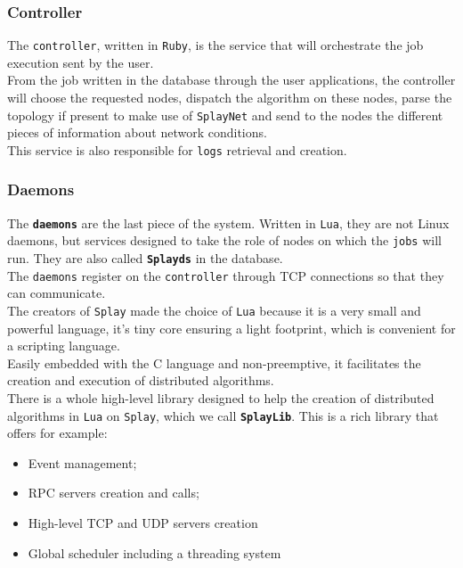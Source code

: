 \documentclass{eplmastersthesis}
\begin{document}
        \subsubsection{Controller}

          The \texttt{controller}, written in \texttt{Ruby}, is the service
          that will orchestrate the job execution sent by the user.\\
          From the job written in the database through the user applications,
          the controller will choose the requested nodes, dispatch the
          algorithm on these nodes, parse the topology if present to make
          use of \texttt{SplayNet} and send to the nodes the different
          pieces of information about network conditions.\\
          This service is also responsible for \texttt{logs}
          retrieval and creation.

        \subsubsection{Daemons}

          The \textbf{\texttt{daemons}} are the last piece of the system.
          Written in \texttt{Lua}, they are not Linux daemons, but services designed
          to take the role of nodes on which the \texttt{jobs} will
          run. They are also called \textbf{\texttt{Splayds}} in the
          database.\\
          The \texttt{daemons} register on the
          \texttt{controller} through TCP connections so that they
          can communicate.\\

          The creators of \texttt{Splay} made the choice of \texttt{Lua} because it is a very
          small and powerful language, it's tiny core ensuring a light
          footprint, which is convenient for a scripting language.\\
          Easily embedded with the C language and non-preemptive, it
          facilitates the creation and execution of distributed algorithms.\\

          There is a whole high-level library designed to help the creation of
          distributed algorithms in \texttt{Lua} on \texttt{Splay}, which we
          call \textbf{\texttt{SplayLib}}. This is a rich library that offers for
          example:

          \begin{itemize}
            \item Event management;
            \item RPC servers creation and calls;
            \item High-level TCP and UDP servers creation
            \item Global scheduler including a threading system
          \end{itemize}
\end{document}
